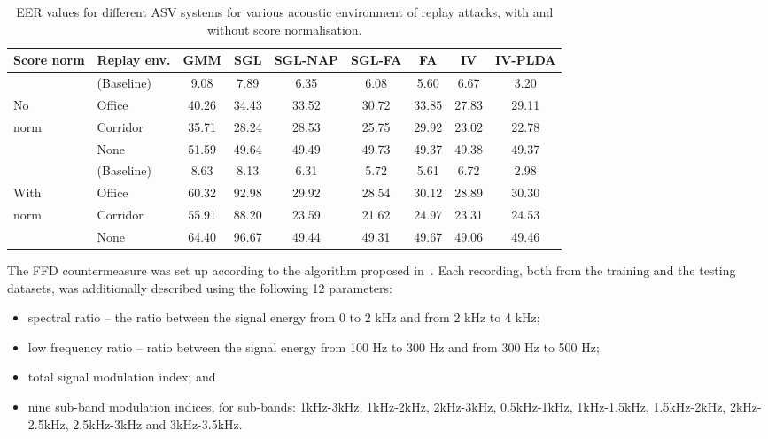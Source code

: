 \begin{table*}
\begin{center}
    \begin{tabular}{ l l || c c c c c c c}
    \hline
Score norm & Replay env. &  GMM & SGL & SGL-NAP  & SGL-FA & FA & IV & IV-PLDA \\ 

 \hline \hline
& (Baseline) & 9.08 & 7.89 & 6.35 & 6.08 & 5.60 & 6.67 & 3.20\\
No & Office  & 40.26 & 34.43 & 33.52 & 30.72 & 33.85 & 27.83 & 29.11\\
norm & Corridor & 35.71 & 28.24 & 28.53 & 25.75 & 29.92 & 23.02 & 22.78\\
& None & 51.59 & 49.64 & 49.49 & 49.73 & 49.37 & 49.38 & 49.37\\
\hline
& (Baseline) & 8.63 & 8.13 & 6.31 & 5.72 & 5.61 & 6.72 & 2.98\\
With & Office  & 60.32 & 92.98 & 29.92 & 28.54 & 30.12 & 28.89 & 30.30\\
norm & Corridor & 55.91 & 88.20 & 23.59 & 21.62 & 24.97 & 23.31 & 24.53\\
& None & 64.40 & 96.67 & 49.44 & 49.31 & 49.67 & 49.06 & 49.46\\
\hline
    \end{tabular}
    \caption{EER values for different ASV systems for various acoustic environment of replay attacks, with and without score normalisation. }
		\label{tab::results_EER}
   \end{center}
\end{table*}


The FFD countermeasure was set up according to the algorithm proposed in~\cite{Villalba2011}. Each recording, both from the training and the testing datasets, was additionally described using the following 12 parameters:
\begin{itemize}
\item spectral ratio -- the ratio between
the signal energy from 0 to 2 kHz and from 2 kHz to 4 kHz;
\item low frequency ratio -- ratio between the signal energy from 100 Hz to 300 Hz
and from 300 Hz to 500 Hz;
\item total signal modulation index; and
\item nine sub-band modulation indices, for sub-bands: 1kHz-3kHz, 1kHz-2kHz,
2kHz-3kHz, 0.5kHz-1kHz, 1kHz-1.5kHz, 1.5kHz-2kHz, 2kHz-2.5kHz, 2.5kHz-3kHz and 3kHz-3.5kHz.
\end{itemize}


